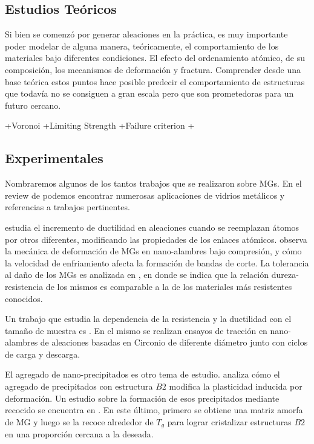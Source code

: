 
\subsection{Estudios Teóricos}
\label{S1_2_1}

Si bien se comenzó por generar aleaciones en la práctica, es muy importante poder modelar de alguna manera, teóricamente, el comportamiento de los materiales bajo diferentes condiciones. El efecto del ordenamiento atómico, de su composición, los mecanismos de deformación y fractura. Comprender desde una base teórica estos puntos hace posible predecir el comportamiento de estructuras que todavía no se consiguen a gran escala pero que son prometedoras para un futuro cercano.

+Voronoi
+Limiting Strength
+Failure criterion
+


\subsection{Experimentales}
\label{S1_2_2}

Nombraremos algunos de los tantos trabajos que se realizaron sobre MGs. En el review de \cite{Axinte11} podemos encontrar numerosas aplicaciones de vidrios metálicos y referencias a trabajos pertinentes.

\cite{Zheng12} estudia el incremento de ductilidad en aleaciones cuando se reemplazan átomos por otros diferentes, modificando las propiedades de los enlaces atómicos. \cite{xiao12} observa la mecánica de deformación de MGs en nano-alambres bajo compresión, y cómo la velocidad de enfriamiento afecta la formación de bandas de corte. La tolerancia al daño de los MGs es analizada en \citep{Demetriou11}, en donde se indica que la relación dureza-resistencia de los mismos es comparable a la de los materiales más resistentes conocidos.

Un trabajo que estudia la dependencia de la resistencia y la ductilidad con el tamaño de muestra es \citep{Dongchan10}. En el mismo se realizan ensayos de tracción en nano-alambres de aleaciones basadas en Circonio de diferente diámetro junto con ciclos de carga y descarga.

El agregado de nano-precipitados es otro tema de estudio. \cite{kuo14} analiza cómo el agregado de precipitados con estructura $B2$ modifica la plasticidad inducida por deformación. Un estudio sobre la formación de esos precipitados mediante recocido se encuentra en \citep{wei14}. En este último, primero se obtiene una matriz amorfa de MG y luego se la recoce alrededor de $T_{g}$ para lograr cristalizar estructuras $B2$ en una proporción cercana a la deseada.

